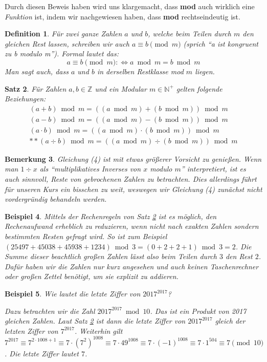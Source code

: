 \documentclass[a4paper]{article}
\newtheorem{satz}{Satz}[section] %
\newtheorem{beispiel}[satz]{Beispiel}
\newtheorem{bemerkung}[satz]{Bemerkung}
\newtheorem{definition}[satz]{Definition} %
\theoremstyle{nonumberplain}
\begin{document}
Durch diesen Beweis haben wird uns klargemacht, dass \textbf{mod} auch wirklich eine \textit{Funktion} ist, indem wir nachgewiesen haben, dass \textbf{mod} rechtseindeutig ist.

\begin{definition}
Für zwei ganze Zahlen $a$ und $b$, welche beim Teilen durch $m$ den gleichen Rest lassen, schreiben wir auch $a \equiv b \pmod{m}$ (sprich "`a ist kongruent zu b modulo m"'). Formal lautet das:
\[
a \equiv b \pmod{m} :\Leftrightarrow a \bmod m = b \bmod m
\]
Man sagt auch, dass $a$ und $b$ in derselben Restklasse mod $m$ liegen.
\end{definition}

\begin{satz}\label{s:mod}
Für Zahlen $a,b \in \mathbb{Z}$ und ein Modular $m \in \mathbb{N}^+$ gelten folgende Beziehungen:
\begin{align}
(a + b) \bmod m = ((a \bmod m) + (b \bmod m)) \bmod m\\
(a - b) \bmod m = ((a \bmod m) - (b \bmod m)) \bmod m\\
(a \cdot b) \bmod m = ((a \bmod m) \cdot (b \bmod m)) \bmod m\\
**(a \div b) \bmod m = ((a \bmod m) \div (b \bmod m)) \bmod m
\end{align}
\end{satz}

\begin{bemerkung}
Gleichung (4) ist mit etwas größerer Vorsicht zu genießen. Wenn man $1 \div x$ als "`multiplikatives Inverses von $x$ modulo $m$"' interpretiert, ist es auch sinnvoll, Reste von gebrochenen Zahlen zu betrachten. Dies allerdings führt für unseren Kurs ein bisschen zu weit, weswegen wir Gleichung (4) zunächst nicht vordergründig behandeln werden.
\end{bemerkung}

\begin{beispiel}
Mittels der Rechenregeln von Satz \ref{s:mod} ist es möglich, den Rechenaufwand erheblich zu reduzieren, wenn nicht nach exakten Zahlen sondern bestimmten Resten gefragt wird. So ist zum Beispiel $(25497 + 45038 + 45938 + 1234) \bmod 3 = (0 + 2 + 2 + 1) \bmod 3 = 2$. Die Summe dieser beachtlich großen Zahlen lässt also beim Teilen durch $3$ den Rest $2$. Dafür haben wir die Zahlen nur kurz angesehen und auch keinen Taschenrechner oder großen Zettel benötigt, um sie explizit zu addieren.
\end{beispiel}

\begin{beispiel}
Wie lautet die letzte Ziffer von $2017^{2017}$?


Dazu betrachten wir die Zahl $2017^{2017} \bmod 10$. Das ist ein Produkt von 2017 gleichen Zahlen. Laut Satz \ref{s:mod} ist dann die letzte Ziffer von $2017^{2017}$ gleich der letzten Ziffer von $7^{2017}$. Weiterhin gilt $7^{2017} \equiv 7^{2 \cdot 1008 + 1} \equiv 7 \cdot (7^2)^{1008} \equiv 7 \cdot 49^{1008} \equiv 7 \cdot (-1)^{1008} \equiv 7 \cdot 1^{504} \equiv 7 \pmod{10}$. Die letzte Ziffer lautet $7$.
\end{beispiel}
\end{document}

